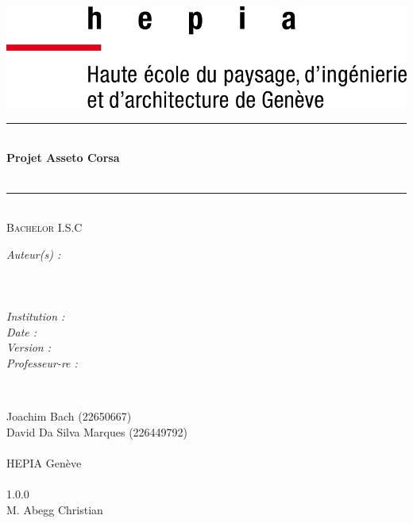 \documentclass[french, 11pt]{article}
\title{\DocSubject}
\author{Joachim BACH ; David DA SILVA MARQUES}
\date{\today}
\makeatletter
\newcommand{\DocVersion}{1.0.0}
\newcommand{\DocTitle}{Projet Asseto Corsa}
\newcommand{\SubjectProfessor}{M. Abegg Christian\xspace}
\let\TheTitle\@title
\let\TheDate\@date
\makeatother
\begin{document}
	
	\normalsize
	
	\begin{titlepage}
		
		\centering
		\vspace*{2.0 cm}
		
		\includegraphics[scale = 1.50]{Images/HEPIA_Logo.png}\\[1.0 cm]
		
		\vspace{1.0 cm}
		
		\rule{\linewidth}{0.3 mm} \\[0.2 cm]
		{\Huge \textbf{\DocTitle}}\\
		\vspace{4 mm}
		{\huge \TheTitle}\\
		\rule{\linewidth}{0.3 mm} \\[1.2 cm]
		
		\textsc{\Large Bachelor I.S.C}\\[0.5 cm]
		
		\vspace{1.5 cm}
		
		\begin{minipage}{0.40\textwidth}
			
			\begin{flushleft}
				\Large\emph{Auteur(s) :}\\[0.2 cm]
				\Large\emph{}\\[0.2 cm]
				\Large\emph{}\\[0.2 cm]
				\Large\emph{}\\[0.2 cm]
				\Large\emph{Institution :}\\[0.2 cm]
				\Large\emph{Date :}\\[0.2 cm]
				\Large\emph{Version :}\\[0.2 cm]
				\Large\emph{Professeur-re :}\\[0.2 cm]
			\end{flushleft}
		
		\end{minipage}~
		\begin{minipage}{0.53\textwidth}
			
			\begin{flushright}
				\Large{Joachim Bach (22650667)}\\[0.2 cm]
				\Large{David Da Silva Marques (226449792)}\\[0.2 cm]
				\Large\emph{}\\[0.2 cm]
				\Large{HEPIA Genève}\\[0.2 cm]
				\Large{\TheDate}\\[0.2 cm]
				\Large{\DocVersion}\\[0.2 cm]
				\Large{\SubjectProfessor}\\[0.2 cm]
			\end{flushright}
		

\end{minipage}
\end{titlepage}
\end{document}
